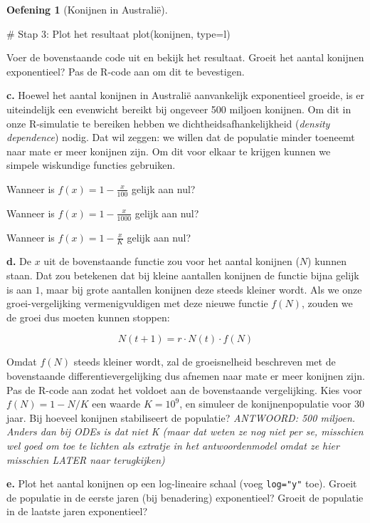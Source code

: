\documentclass[
  a4paper,
]{scrbook}
\newenvironment{Shaded}{\begin{snugshade}}{\end{snugshade}}
\newcommand{\AttributeTok}[1]{\textcolor[rgb]{0.40,0.45,0.13}{#1}}
\newcommand{\CommentTok}[1]{\textcolor[rgb]{0.37,0.37,0.37}{#1}}
\newcommand{\FunctionTok}[1]{\textcolor[rgb]{0.28,0.35,0.67}{#1}}
\newcommand{\NormalTok}[1]{\textcolor[rgb]{0.00,0.23,0.31}{#1}}
\newcommand{\StringTok}[1]{\textcolor[rgb]{0.13,0.47,0.30}{#1}}
\theoremstyle{definition}
\newtheorem{exercise}{Oefening}[chapter]
\theoremstyle{remark}
\begin{document}
\begin{exercise}[Konijnen in
Australië]
\begin{Shaded}
\begin{Highlighting}[]
\CommentTok{\# Stap 3: Plot het resultaat}
\FunctionTok{plot}\NormalTok{(konijnen, }\AttributeTok{type=}\StringTok{\textquotesingle{}l\textquotesingle{}}\NormalTok{)}
\end{Highlighting}
\end{Shaded}

Voer de bovenstaande code uit en bekijk het resultaat. Groeit het aantal
konijnen exponentieel? Pas de R-code aan om dit te bevestigen.

\textbf{c.} Hoewel het aantal konijnen in Australië aanvankelijk
exponentieel groeide, is er uiteindelijk een evenwicht bereikt bij
ongeveer 500 miljoen konijnen. Om dit in onze R-simulatie te bereiken
hebben we dichtheidsafhankelijkheid (\emph{density dependence}) nodig.
Dat wil zeggen: we willen dat de populatie minder toeneemt naar mate er
meer konijnen zijn. Om dit voor elkaar te krijgen kunnen we simpele
wiskundige functies gebruiken.

Wanneer is \(f(x) = 1 - \frac{x}{100}\) gelijk aan nul?

Wanneer is \(f(x) = 1 - \frac{x}{1000}\) gelijk aan nul?

Wanneer is \(f(x) = 1 - \frac{x}{K}\) gelijk aan nul?

\textbf{d.} De \(x\) uit de bovenstaande functie zou voor het aantal
konijnen (\(N\)) kunnen staan. Dat zou betekenen dat bij kleine
aantallen konijnen de functie bijna gelijk is aan \(1\), maar bij grote
aantallen konijnen deze steeds kleiner wordt. Als we onze
groei-vergelijking vermenigvuldigen met deze nieuwe functie \(f(N)\),
zouden we de groei dus moeten kunnen stoppen:

\[
N(t+1) = r \cdot N(t) \cdot f(N)
\]

Omdat \(f(N)\) steeds kleiner wordt, zal de groeisnelheid beschreven met
de bovenstaande differentievergelijking dus afnemen naar mate er meer
konijnen zijn. Pas de R-code aan zodat het voldoet aan de bovenstaande
vergelijking. Kies voor \(f(N)=1-N/K\) een waarde \(K=10^9\), en
simuleer de konijnenpopulatie voor 30 jaar. Bij hoeveel konijnen
stabiliseert de populatie? \emph{ANTWOORD: 500 miljoen. Anders dan bij
ODEs is dat niet K (maar dat weten ze nog niet per se, misschien wel
goed om toe te lichten als extratje in het antwoordenmodel omdat ze hier
misschien LATER naar terugkijken)}

\textbf{e.} Plot het aantal konijnen op een log-lineaire schaal (voeg
\texttt{log="y"} toe). Groeit de populatie in de eerste jaren (bij
benadering) exponentieel? Groeit de populatie in de laatste jaren
exponentieel?


\end{exercise}
\end{document}
